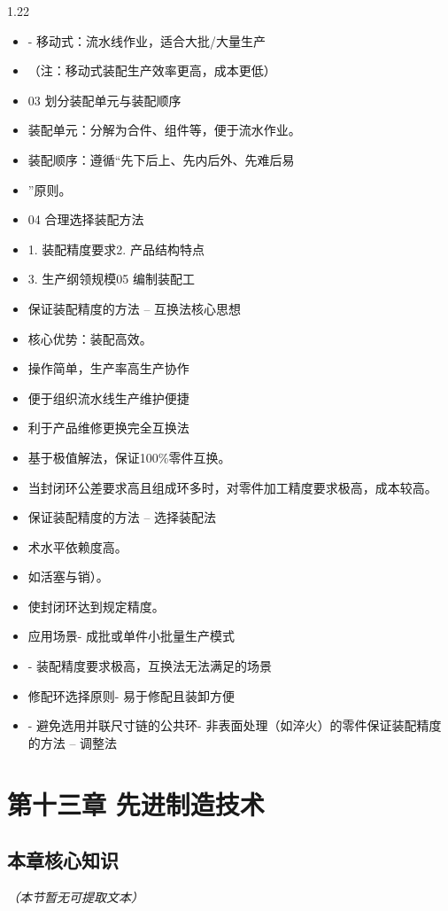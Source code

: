 \documentclass[12pt,a4paper]{article}
\begin{document}
\begin{spacing}{1.22}
\begin{itemize}[leftmargin=2.2em,label=--]
  \item - 移动式：流水线作业，适合大批/大量生产
  \item （注：移动式装配生产效率更高，成本更低）
  \item 03 划分装配单元与装配顺序
  \item 装配单元：分解为合件、组件等，便于流水作业。
  \item 装配顺序：遵循“先下后上、先内后外、先难后易
  \item ”原则。
  \item 04 合理选择装配方法
  \item 1. 装配精度要求2. 产品结构特点
  \item 3. 生产纲领规模05 编制装配工
  \item 保证装配精度的方法 – 互换法核心思想
  \item 核心优势：装配高效。
  \item 操作简单，生产率高生产协作
  \item 便于组织流水线生产维护便捷
  \item 利于产品维修更换完全互换法
  \item 基于极值解法，保证100\%零件互换。
  \item 当封闭环公差要求高且组成环多时，对零件加工精度要求极高，成本较高。
  \item 保证装配精度的方法 – 选择装配法
  \item 术水平依赖度高。
  \item 如活塞与销）。
  \item 使封闭环达到规定精度。
  \item 应用场景- 成批或单件小批量生产模式
  \item - 装配精度要求极高，互换法无法满足的场景
  \item 修配环选择原则- 易于修配且装卸方便
  \item - 避免选用并联尺寸链的公共环- 非表面处理（如淬火）的零件保证装配精度的方法 – 调整法
\end{itemize}

\section{第十三章 先进制造技术}
\subsection{本章核心知识}
\textit{（本节暂无可提取文本）}


\end{spacing}
\end{document}
